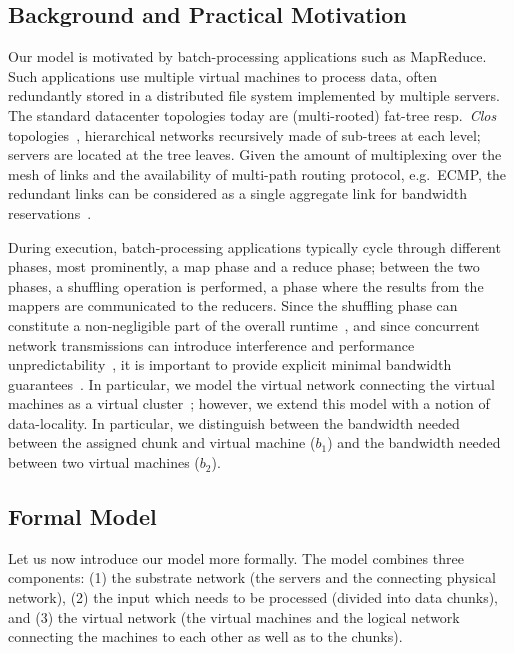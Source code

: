 \documentclass[preprint,12pt]{elsarticle}
\newcommand{\CostTrans}{\ensuremath{b_1}}
\newcommand{\CostCom}{\ensuremath{b_2}}
\begin{document}
\subsection{Background and Practical Motivation}

Our model is motivated by batch-processing applications such as MapReduce.
Such applications use multiple virtual machines to
process data, often redundantly stored in a distributed file system implemented
by multiple servers.~\cite{local-schedule-1,mapreduce}
The standard datacenter topologies today are (multi-rooted) fat-tree resp.~\emph{Clos} topologies~\cite{fattree,vl2},
hierarchical networks  recursively made of sub-trees at each level;
servers are located at the
tree leaves. Given the amount of multiplexing over the mesh of links
and the availability of multi-path routing protocol, e.g.~ECMP, the redundant
links can be considered as a single aggregate link for bandwidth
reservations~\cite{oktopus,infocom16,ccr15emb,proteus}.

During execution, batch-processing applications typically cycle through different phases,
most prominently, a map phase and a reduce phase; between the two phases,
a shuffling operation is performed, a phase where the results from the mappers
are communicated to the reducers. Since the shuffling phase can constitute a
non-negligible part of the overall runtime~\cite{orchestra},
and since concurrent network transmissions can introduce interference and
performance unpredictability~\cite{amazonbw}, it is important
to provide explicit minimal bandwidth guarantees~\cite{talk-about}.
In particular, we model the virtual network connecting the virtual machines
as a virtual cluster~\cite{oktopus,talk-about,proteus};
however, we extend this model with a notion of data-locality.
In particular, we distinguish between the bandwidth needed between the assigned chunk
and virtual machine ($\CostTrans$) and the bandwidth needed between
two virtual machines ($\CostCom$). 

\subsection{Formal Model}

Let us now introduce our model more formally. 
The model combines three components: (1) the substrate network (the servers
and the connecting physical network),
(2) the input which needs to be processed (divided into data chunks), and
(3) the virtual network (the virtual machines and the logical network connecting the machines to each other
as well as to the chunks).
\end{document}
